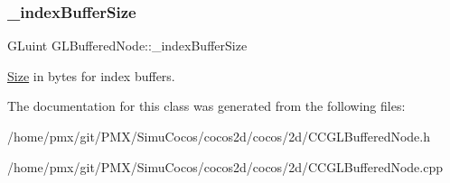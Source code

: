 \subsubsection{\texorpdfstring{\+\_\+index\+Buffer\+Size}{\_indexBufferSize}}
{\footnotesize\ttfamily G\+Luint G\+L\+Buffered\+Node\+::\+\_\+index\+Buffer\+Size}

\hyperlink{classSize}{Size} in bytes for index buffers. 

The documentation for this class was generated from the following files\+:\begin{DoxyCompactItemize}
\item 
/home/pmx/git/\+P\+M\+X/\+Simu\+Cocos/cocos2d/cocos/2d/C\+C\+G\+L\+Buffered\+Node.\+h\item 
/home/pmx/git/\+P\+M\+X/\+Simu\+Cocos/cocos2d/cocos/2d/C\+C\+G\+L\+Buffered\+Node.\+cpp\end{DoxyCompactItemize}
